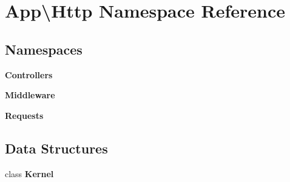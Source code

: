 \section{App\textbackslash{}Http Namespace Reference}
\label{namespace_app_1_1_http}
\subsection*{Namespaces}
\begin{DoxyCompactItemize}
\item 
 {\bf Controllers}
\item 
 {\bf Middleware}
\item 
 {\bf Requests}
\end{DoxyCompactItemize}
\subsection*{Data Structures}
\begin{DoxyCompactItemize}
\item 
class {\bf Kernel}
\end{DoxyCompactItemize}
